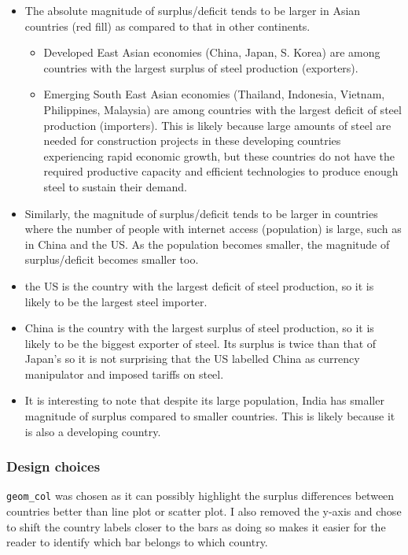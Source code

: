 \documentclass[
]{article}
\providecommand{\tightlist}{%
  \setlength{\itemsep}{0pt}\setlength{\parskip}{0pt}}
\begin{document}
\begin{itemize}
\tightlist
\item
  The absolute magnitude of surplus/deficit tends to be larger in Asian
  countries (red fill) as compared to that in other continents.

  \begin{itemize}
  \tightlist
  \item
    Developed East Asian economies (China, Japan, S. Korea) are among
    countries with the largest surplus of steel production (exporters).
  \item
    Emerging South East Asian economies (Thailand, Indonesia, Vietnam,
    Philippines, Malaysia) are among countries with the largest deficit
    of steel production (importers). This is likely because large
    amounts of steel are needed for construction projects in these
    developing countries experiencing rapid economic growth, but these
    countries do not have the required productive capacity and efficient
    technologies to produce enough steel to sustain their demand.
  \end{itemize}
\item
  Similarly, the magnitude of surplus/deficit tends to be larger in
  countries where the number of people with internet access (population)
  is large, such as in China and the US. As the population becomes
  smaller, the magnitude of surplus/deficit becomes smaller too.
\item
  the US is the country with the largest deficit of steel production, so
  it is likely to be the largest steel importer.
\item
  China is the country with the largest surplus of steel production, so
  it is likely to be the biggest exporter of steel. Its surplus is twice
  than that of Japan's so it is not surprising that the US labelled
  China as currency manipulator and imposed tariffs on steel.
\item
  It is interesting to note that despite its large population, India has
  smaller magnitude of surplus compared to smaller countries. This is
  likely because it is also a developing country.
\end{itemize}

\hypertarget{design-choices}{%
\subsubsection{Design choices}\label{design-choices}}

\texttt{geom\_col} was chosen as it can possibly highlight the surplus
differences between countries better than line plot or scatter plot. I
also removed the y-axis and chose to shift the country labels closer to
the bars as doing so makes it easier for the reader to identify which
bar belongs to which country.
\end{document}
